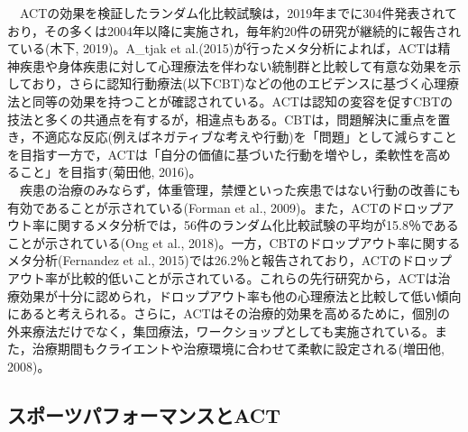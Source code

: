 \documentclass[12pt,a4paper,xelatex,ja=standard]{bxjsarticle}
\begin{document}
　ACTの効果を検証したランダム化比較試験は，2019年までに304件発表されており，その多くは2004年以降に実施され，毎年約20件の研究が継続的に報告されている(木下,
2019)。A\_tjak et
al.(2015)が行ったメタ分析によれば，ACTは精神疾患や身体疾患に対して心理療法を伴わない統制群と比較して有意な効果を示しており，さらに認知行動療法(以下CBT)などの他のエビデンスに基づく心理療法と同等の効果を持つことが確認されている。ACTは認知の変容を促すCBTの技法と多くの共通点を有するが，相違点もある。CBTは，問題解決に重点を置き，不適応な反応(例えばネガティブな考えや行動)を「問題」として減らすことを目指す一方で，ACTは「自分の価値に基づいた行動を増やし，柔軟性を高めること」を目指す(菊田他,
2016)。\\
　疾患の治療のみならず，体重管理，禁煙といった疾患ではない行動の改善にも有効であることが示されている(Forman
et al.,
2009)。また，ACTのドロップアウト率に関するメタ分析では，56件のランダム化比較試験の平均が15.8％であることが示されている(Ong
et al., 2018)。一方，CBTのドロップアウト率に関するメタ分析(Fernandez et
al.,
2015)では26.2％と報告されており，ACTのドロップアウト率が比較的低いことが示されている。これらの先行研究から，ACTは治療効果が十分に認められ，ドロップアウト率も他の心理療法と比較して低い傾向にあると考えられる。さらに，ACTはその治療的効果を高めるために，個別の外来療法だけでなく，集団療法，ワークショップとしても実施されている。また，治療期間もクライエントや治療環境に合わせて柔軟に設定される(増田他,
2008)。

\hypertarget{ux30b9ux30ddux30fcux30c4ux30d1ux30d5ux30a9ux30fcux30deux30f3ux30b9ux3068act}{%
\subsection{スポーツパフォーマンスとACT}\label{ux30b9ux30ddux30fcux30c4ux30d1ux30d5ux30a9ux30fcux30deux30f3ux30b9ux3068act}}
\end{document}
